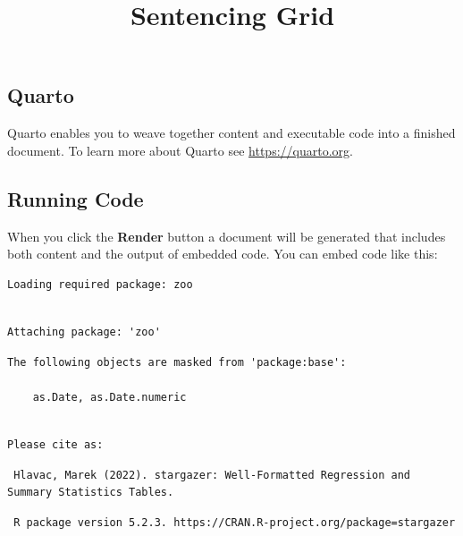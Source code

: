 \documentclass[
  letterpaper,
  DIV=11,
  numbers=noendperiod]{scrartcl}
\title{Sentencing Grid}
\author{}
\date{}
\begin{document}
\maketitle
\ifdefined\Shaded\renewenvironment{Shaded}{\begin{tcolorbox}[boxrule=0pt, breakable, interior hidden, sharp corners, borderline west={3pt}{0pt}{shadecolor}, enhanced, frame hidden]}{\end{tcolorbox}}\fi

\hypertarget{quarto}{%
\subsection{Quarto}\label{quarto}}

Quarto enables you to weave together content and executable code into a
finished document. To learn more about Quarto see
\url{https://quarto.org}.

\hypertarget{running-code}{%
\subsection{Running Code}\label{running-code}}

When you click the \textbf{Render} button a document will be generated
that includes both content and the output of embedded code. You can
embed code like this:

\begin{verbatim}
Loading required package: zoo
\end{verbatim}

\begin{verbatim}

Attaching package: 'zoo'
\end{verbatim}

\begin{verbatim}
The following objects are masked from 'package:base':

    as.Date, as.Date.numeric
\end{verbatim}

\begin{verbatim}

Please cite as: 
\end{verbatim}

\begin{verbatim}
 Hlavac, Marek (2022). stargazer: Well-Formatted Regression and Summary Statistics Tables.
\end{verbatim}

\begin{verbatim}
 R package version 5.2.3. https://CRAN.R-project.org/package=stargazer 
\end{verbatim}
\end{document}
